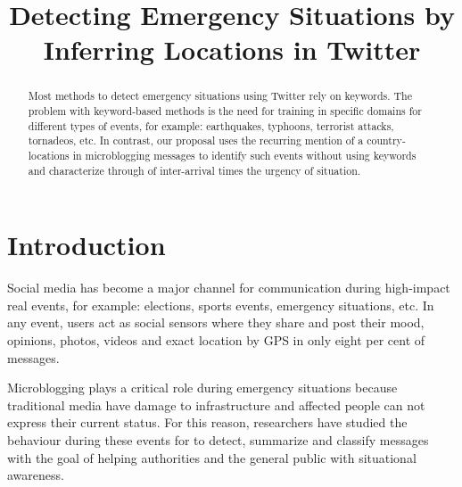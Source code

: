 \documentclass{ewic}
\begin{document}


\title{Detecting Emergency Situations by Inferring Locations in Twitter}





\begin{abstract}
Most methods to detect emergency situations using Twitter rely on keywords. The problem with keyword-based methods is the need for training in specific domains for different types of events, for example: earthquakes, typhoons, terrorist attacks, tornadeos, etc.
In contrast, our proposal uses the recurring mention of a country-locations in microblogging messages to identify such events without using keywords and characterize through of inter-arrival times the urgency of situation.
\end{abstract}


\maketitle

\section{Introduction}
Social media has become a major channel for communication during high-impact real events, for example: elections, sports events, emergency situations, etc. In any event, users act as social sensors where they share and post their mood, opinions, photos, videos and exact location by GPS in only eight per cent of messages.

Microblogging plays a critical role during emergency situations because traditional media have damage to infrastructure and affected people can not express their current status. For this reason, researchers have studied the behaviour during these events for to detect, summarize and classify messages with the goal of helping authorities and the general public with situational awareness.
\end{document}
